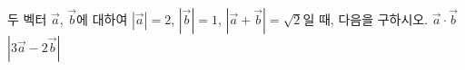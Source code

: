 두 벡터 $\vec{a}$, $\vec{b}$에 대하여 $|\vec{a}|=2$, $|\vec{b}|=1$, $|\vec{a}+\vec{b}|=\sqrt{2}$일 때, 다음을 구하시오.
 $\vec{a}\cdot\vec{b}$
 $|3\vec{a}-2\vec{b}|$
